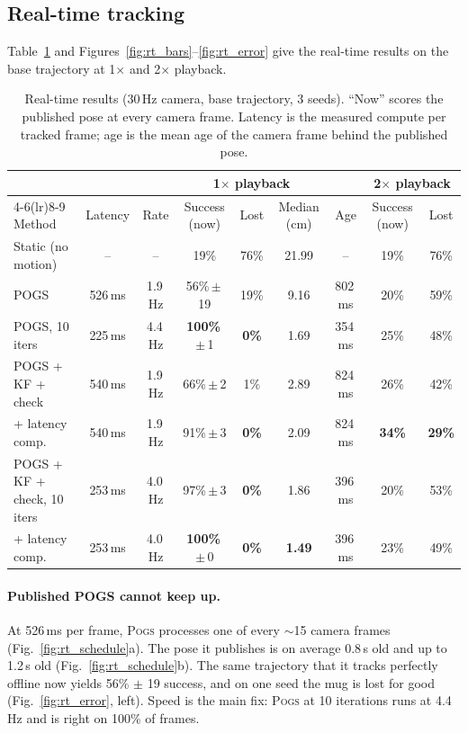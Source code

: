 \documentclass[10pt,a4paper]{article}
\newcommand{\pogs}{\textsc{Pogs}}
\newcommand{\best}[1]{\textbf{#1}}
\begin{document}
\subsection{Real-time tracking}

Table~\ref{tab:rt} and Figures~\ref{fig:rt_bars}--\ref{fig:rt_error} give the
real-time results on the base trajectory at 1$\times$ and 2$\times$ playback.

\begin{table}[t]
\centering\small
\caption{Real-time results (30\,Hz camera, base trajectory, 3 seeds). ``Now''
scores the published pose at every camera frame. Latency is the measured compute
per tracked frame; age is the mean age of the camera frame behind the published
pose.}
\label{tab:rt}
\setlength{\tabcolsep}{4pt}
\begin{tabular}{lcccccccc}
\toprule
& & & \multicolumn{3}{c}{1$\times$ playback} & & \multicolumn{2}{c}{2$\times$ playback} \\
\cmidrule(lr){4-6}\cmidrule(lr){8-9}
Method & Latency & Rate & Success (now) & Lost & Median (cm) & Age & Success (now) & Lost \\
\midrule
Static (no motion)                & --     & --     & 19\% & 76\% & 21.99 & -- & 19\% & 76\% \\
POGS                              & 526\,ms & 1.9\,Hz & 56\%\,$\pm$\,19 & 19\% & 9.16 & 802\,ms & 20\% & 59\% \\
POGS, 10 iters                    & 225\,ms & 4.4\,Hz & \best{100\%}\,$\pm$\,1 & \best{0\%} & 1.69 & 354\,ms & 25\% & 48\% \\
POGS + KF + check                 & 540\,ms & 1.9\,Hz & 66\%\,$\pm$\,2 & 1\% & 2.89 & 824\,ms & 26\% & 42\% \\
\quad + latency comp.             & 540\,ms & 1.9\,Hz & 91\%\,$\pm$\,3 & \best{0\%} & 2.09 & 824\,ms & \best{34\%} & \best{29\%} \\
POGS + KF + check, 10 iters       & 253\,ms & 4.0\,Hz & 97\%\,$\pm$\,3 & \best{0\%} & 1.86 & 396\,ms & 20\% & 53\% \\
\quad + latency comp.             & 253\,ms & 4.0\,Hz & \best{100\%}\,$\pm$\,0 & \best{0\%} & \best{1.49} & 396\,ms & 23\% & 49\% \\
\bottomrule
\end{tabular}
\end{table}

\paragraph{Published POGS cannot keep up.} At 526\,ms per frame, \pogs{}
processes one of every $\sim$15 camera frames (Fig.~\ref{fig:rt_schedule}a). The
pose it publishes is on average 0.8\,s old and up to 1.2\,s old
(Fig.~\ref{fig:rt_schedule}b). The same trajectory that it tracks perfectly
offline now yields 56\% $\pm$ 19 success, and on one seed the mug is lost for
good (Fig.~\ref{fig:rt_error}, left). Speed is the main fix: \pogs{} at 10
iterations runs at 4.4\,Hz and is right on 100\% of frames.
\end{document}
